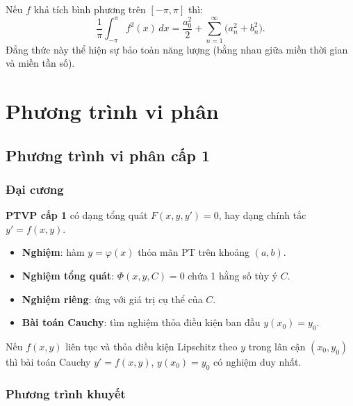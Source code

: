 \documentclass[12pt,a4paper]{article}
\begin{document}
\begin{dinhly}[title={Đẳng thức Parseval}]
  Nếu $f$ khả tích bình phương trên $[-\pi, \pi]$ thì:
  \[
    \frac{1}{\pi}\int_{-\pi}^{\pi} f^2(x)\,dx = \frac{a_0^2}{2} + \sum_{n=1}^{\infty} \bigl(a_n^2 + b_n^2\bigr).
  \]
  Đẳng thức này thể hiện sự bảo toàn năng lượng (bằng nhau giữa miền thời gian và miền tần số).
\end{dinhly}

\section{Phương trình vi phân}

\subsection{Phương trình vi phân cấp 1}

\subsubsection{Đại cương}

\begin{dinhnghia}
  \textbf{PTVP cấp 1} có dạng tổng quát $F(x, y, y') = 0$, hay dạng chính tắc $y' = f(x, y)$.

  \begin{itemize}
    \item \textbf{Nghiệm}: hàm $y = \varphi(x)$ thỏa mãn PT trên khoảng $(a, b)$.
    \item \textbf{Nghiệm tổng quát}: $\Phi(x, y, C) = 0$ chứa 1 hằng số tùy ý $C$.
    \item \textbf{Nghiệm riêng}: ứng với giá trị cụ thể của $C$.
    \item \textbf{Bài toán Cauchy}: tìm nghiệm thỏa điều kiện ban đầu $y(x_0) = y_0$.
  \end{itemize}
\end{dinhnghia}

\begin{dinhly}[title={Định lý Picard (tồn tại và duy nhất)}]
  Nếu $f(x,y)$ liên tục và thỏa điều kiện Lipschitz theo $y$ trong lân cận $(x_0, y_0)$ thì bài toán Cauchy $y' = f(x,y)$, $y(x_0) = y_0$ có nghiệm duy nhất.
\end{dinhly}

\subsubsection{Phương trình khuyết}
\end{document}
